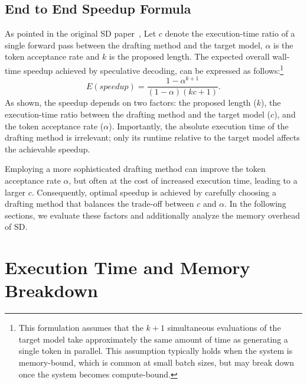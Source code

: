 \documentclass{article}
\newcommand{\lily}[1]{\textcolor{blue}{Lily: #1}}
\newcommand{\jerry}[1]{\textcolor{cyan}{Jerry: #1}}
\begin{document}

\subsection{End to End Speedup Formula}
As pointed in the original SD paper~\cite{leviathan2023fast},
Let $c$ denote the execution-time ratio of a single forward pass between the drafting method and the target model, $\alpha$ is the token acceptance rate and $k$ is the proposed length. The expected overall wall-time speedup achieved by speculative decoding, can be expressed as follows:\footnote{This formulation assumes that the $k + 1$ simultaneous evaluations of the target model take approximately the same amount of time as generating a single token in parallel. This assumption typically holds when the system is memory-bound, which is common at small batch sizes, but may break down once the system becomes compute-bound.}
\begin{equation}
\label{eq:speedup}
     E(speedup)=\frac{1-\alpha^{k+1}}{(1-\alpha)(kc+1)}.
\end{equation}
As shown, the speedup depends on two factors: the proposed length ($k$), the execution-time ratio between the drafting method and the target model ($c$), and the token acceptance rate ($\alpha$). Importantly, the absolute execution time of the drafting method is irrelevant; only its runtime relative to the target model affects the achievable speedup.

Employing a more sophisticated drafting method can improve the token acceptance rate $\alpha$, but often at the cost of increased execution time, leading to a larger $c$. Consequently, optimal speedup is achieved by carefully choosing a drafting method that balances the trade-off between $c$ and $\alpha$. In the following sections, we evaluate these factors and additionally analyze the memory overhead of SD.

\section{Execution Time and Memory Breakdown}
\label{sec:breakdown}
\end{document}
